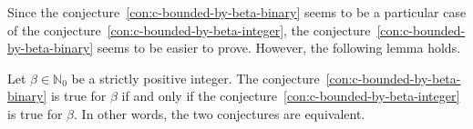 Since the conjecture~\ref{con:c-bounded-by-beta-binary} seems to be a particular case of the conjecture~\ref{con:c-bounded-by-beta-integer}, the conjecture~\ref{con:c-bounded-by-beta-binary} seems to be easier to prove.
However, the following lemma holds.

\begin{lemma}
    \label{lem:pm_graphs_with_integer_weights}
    Let $\beta \in \mathbb{N}_0$ be a strictly positive integer.
    The conjecture~\ref{con:c-bounded-by-beta-binary} is true for $\beta$ if and only if the conjecture~\ref{con:c-bounded-by-beta-integer} is true for $\beta$.
    In other words, the two conjectures are equivalent.
\end{lemma}

